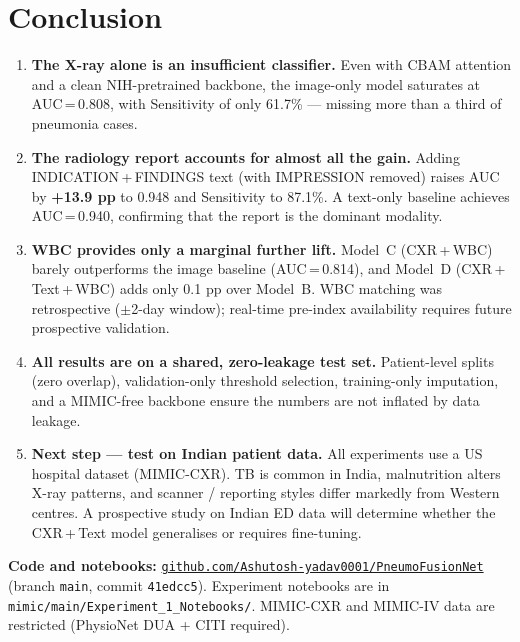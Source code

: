\documentclass{article}
\begin{document}
\section{Conclusion}

\begin{enumerate}[noitemsep,leftmargin=*,topsep=3pt]

  \item \textbf{The X-ray alone is an insufficient classifier.}
    Even with CBAM attention and a clean NIH-pretrained backbone, the
    image-only model saturates at AUC\,=\,0.808, with Sensitivity of
    only 61.7\% — missing more than a third of pneumonia cases.

  \item \textbf{The radiology report accounts for almost all the gain.}
    Adding INDICATION\,+\,FINDINGS text (with IMPRESSION removed) raises
    AUC by \textbf{+13.9 pp} to 0.948 and Sensitivity to 87.1\%.
    A text-only baseline achieves AUC\,=\,0.940, confirming that the
    report is the dominant modality.

  \item \textbf{WBC provides only a marginal further lift.}
    Model~C (CXR\,+\,WBC) barely outperforms the image baseline
    (AUC\,=\,0.814), and Model~D (CXR\,+\,Text\,+\,WBC) adds only
    0.1 pp over Model~B.
    WBC matching was retrospective ($\pm$2-day window); real-time
    pre-index availability requires future prospective validation.

  \item \textbf{All results are on a shared, zero-leakage test set.}
    Patient-level splits (zero overlap), validation-only threshold
    selection, training-only imputation, and a MIMIC-free backbone
    ensure the numbers are not inflated by data leakage.

  \item \textbf{Next step — test on Indian patient data.}
    All experiments use a US hospital dataset (MIMIC-CXR).
    TB is common in India, malnutrition alters X-ray patterns,
    and scanner / reporting styles differ markedly from Western centres.
    A prospective study on Indian ED data will determine whether the
    CXR\,+\,Text model generalises or requires fine-tuning.

\end{enumerate}

\noindent\textbf{Code and notebooks:}
\href{https://github.com/Ashutosh-yadav0001/PneumoFusionNet}%
{\texttt{github.com/Ashutosh-yadav0001/PneumoFusionNet}}
(branch \texttt{main}, commit \texttt{41edcc5}).
Experiment notebooks are in \texttt{mimic/main/Experiment\_1\_Notebooks/}.
MIMIC-CXR and MIMIC-IV data are restricted (PhysioNet DUA + CITI required).
\end{document}
